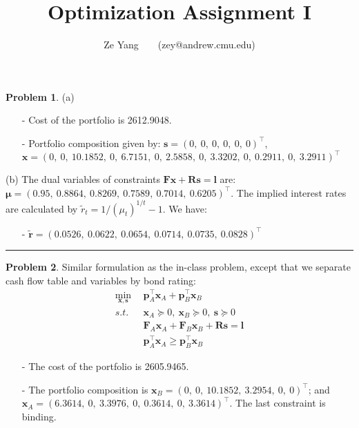 \documentclass[a4paper, 8pt]{article}
\title{\textbf{Optimization Assignment I}}
\author{Ze Yang~~~~(zey@andrew.cmu.edu)}
\theoremstyle{definition}
\newtheorem{problem}{Problem}
\theoremstyle{hSol}
\begin{document}
\maketitle


\begin{problem} (a)
\begin{itemize}
	\item[-] Cost of the portfolio is 2612.9048.
	\item[-] Portfolio composition given by: $\bm{s}=(0,~0,~0,~0,~0,~0)^{\top}$,\\
	$\bm{x}=(0, ~0,~ 10.1852, ~0, ~6.7151, ~0, ~2.5858,~ 0, ~3.3202, ~0, ~0.2911, ~0, ~3.2911)^{\top}$
\end{itemize}
(b) The dual variables of constraints $\bm{Fx}+\bm{Rs}=\bm{l}$ are: $\bm{\mu} = (0.95,~0.8864,~0.8269,~0.7589,~0.7014,~0.6205)^{\top}$. The implied interest rates are calculated by $\widetilde{r}_t = 1/(\mu_t)^{1/t} - 1$. We have:
\begin{itemize}
	\item[-] $\widetilde{\bm{r}} = (0.0526, ~0.0622, ~0.0654,~0.0714,~0.0735,~0.0828)^{\top}$
\end{itemize}
\end{problem}

\noindent\rule{16cm}{0.4pt}
\begin{problem} Similar formulation as the in-class problem, except that we separate cash flow table and variables by bond rating:
\begin{equation}
	\begin{split}
		\underset{\bm{x}, \bm{s}}{\text{min}} ~~ & \bm{p}_A^{\top} \bm{x}_A + \bm{p}_B^{\top} \bm{x}_B \\
		s.t.~~ & \bm{x}_A \succeq 0,~\bm{x}_B \succeq 0,~\bm{s} \succeq 0 \\
		& \bm{F}_A \bm{x}_A + \bm{F}_B \bm{x}_B + \bm{Rs} = \bm{l} \\
		& \bm{p}_A^{\top} \bm{x}_A \geq \bm{p}_B^{\top} \bm{x}_B
	\end{split}
\end{equation}
\begin{itemize}
	\item[-] The cost of the portfolio is 2605.9465.
	\item[-] The portfolio composition is $\bm{x}_B = ( 0, ~0,~ 10.1852, ~3.2954, ~0, ~0)^{\top}$; and \\ $\bm{x}_A = (6.3614, ~0,~ 3.3976,~ 0, ~0.3614,~ 0, ~3.3614)^{\top}$. The last constraint is binding.
\end{itemize}
\end{problem}
\end{document}
